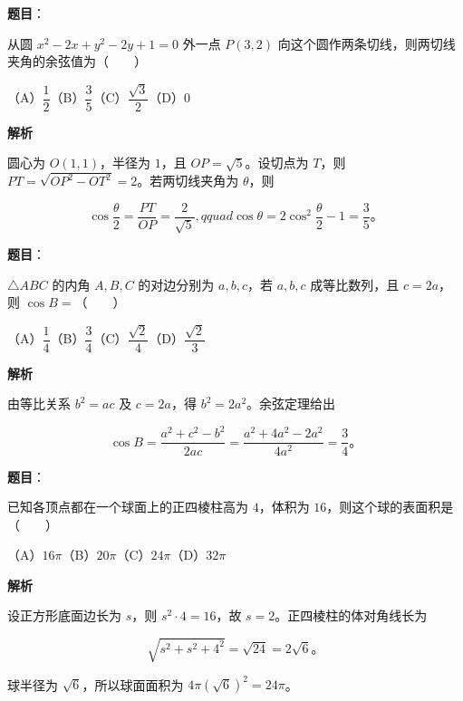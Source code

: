 \begin{answer}

\textbf{题目}：

从圆 $x^2-2x+y^2-2y+1=0$ 外一点 $P(3,2)$ 向这个圆作两条切线，则两切线夹角的余弦值为\mbox{（　　）}

（A）$\dfrac12$\quad（B）$\dfrac35$\quad（C）$\dfrac{\sqrt3}2$\quad（D）$0$

\textbf{解析}

圆心为 $O(1,1)$，半径为 $1$，且 $OP=\sqrt5$。设切点为 $T$，则 $PT=\sqrt{OP^2-OT^2}=2$。若两切线夹角为 $\theta$，则

\nopagebreak[4]
\[
\cos\frac\theta2=\frac{PT}{OP}=\frac2{\sqrt5},qquad
\cos\theta=2\cos^2\frac\theta2-1=\frac35\text{。}
\]


\end{answer}
\begin{answer}

\textbf{题目}：

$\triangle ABC$ 的内角 $A,B,C$ 的对边分别为 $a,b,c$，若 $a,b,c$ 成等比数列，且 $c=2a$，则 $\cos B=$\mbox{（　　）}

（A）$\dfrac14$\quad（B）$\dfrac34$\quad（C）$\dfrac{\sqrt2}4$\quad（D）$\dfrac{\sqrt2}3$

\textbf{解析}

由等比关系 $b^2=ac$ 及 $c=2a$，得 $b^2=2a^2$。余弦定理给出

\nopagebreak[4]
\[
\cos B=\frac{a^2+c^2-b^2}{2ac}
=\frac{a^2+4a^2-2a^2}{4a^2}=\frac34\text{。}
\]


\end{answer}
\begin{answer}

\textbf{题目}：

已知各顶点都在一个球面上的正四棱柱高为 $4$，体积为 $16$，则这个球的表面积是\mbox{（　　）}

（A）$16\pi$\quad（B）$20\pi$\quad（C）$24\pi$\quad（D）$32\pi$

\textbf{解析}

设正方形底面边长为 $s$，则 $s^2\cdot4=16$，故 $s=2$。正四棱柱的体对角线长为

\nopagebreak[4]
\[
\sqrt{s^2+s^2+4^2}=\sqrt{24}=2\sqrt6\text{。}
\]

球半径为 $\sqrt6$，所以球面面积为 $4\pi(\sqrt6)^2=24\pi$。


\end{answer}
